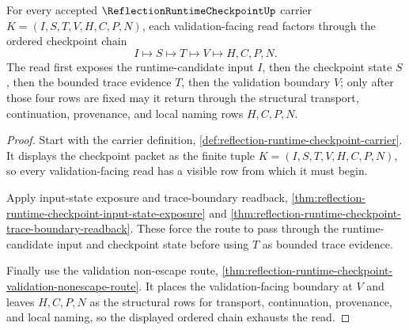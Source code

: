 \begin{theorem}
\label{thm:reflection-runtime-checkpoint-candidate-trace-validation-chain}
For every accepted $\ReflectionRuntimeCheckpointUp$ carrier $K=(I,S,T,V,H,C,P,N)$, each validation-facing read factors through the ordered checkpoint chain
$$
I \longmapsto S \longmapsto T \longmapsto V \longmapsto H,C,P,N.
$$
The read first exposes the runtime-candidate input $I$, then the checkpoint state $S$, then the bounded trace evidence $T$, then the validation boundary $V$; only after those four rows are fixed may it return through the structural transport, continuation, provenance, and local naming rows $H,C,P,N$.
\end{theorem}
\begin{proof}
Start with the carrier definition, \autoref{def:reflection-runtime-checkpoint-carrier}. It displays the checkpoint packet as the finite tuple $K=(I,S,T,V,H,C,P,N)$, so every validation-facing read has a visible row from which it must begin.

Apply input-state exposure and trace-boundary readback, \autoref{thm:reflection-runtime-checkpoint-input-state-exposure} and \autoref{thm:reflection-runtime-checkpoint-trace-boundary-readback}. These force the route to pass through the runtime-candidate input and checkpoint state before using $T$ as bounded trace evidence.

Finally use the validation non-escape route, \autoref{thm:reflection-runtime-checkpoint-validation-nonescape-route}. It places the validation-facing boundary at $V$ and leaves $H,C,P,N$ as the structural rows for transport, continuation, provenance, and local naming, so the displayed ordered chain exhausts the read.
\end{proof}

